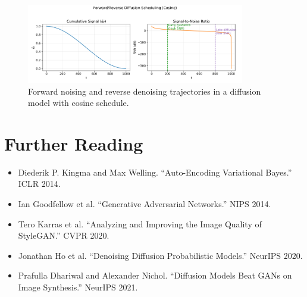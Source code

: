 \documentclass{article}
\begin{document}
\begin{figure}[H]
  \centering
  \includegraphics[width=0.85\textwidth]{diffusion_process.png}
  \caption{Forward noising and reverse denoising trajectories in a diffusion model with cosine schedule.}
  \label{fig:diffusion_process}
\end{figure}
\FloatBarrier

\section*{Further Reading}
\begin{itemize}
  \item Diederik P. Kingma and Max Welling. ``Auto-Encoding Variational Bayes.'' ICLR 2014.
  \item Ian Goodfellow et al. ``Generative Adversarial Networks.'' NIPS 2014.
  \item Tero Karras et al. ``Analyzing and Improving the Image Quality of StyleGAN.'' CVPR 2020.
  \item Jonathan Ho et al. ``Denoising Diffusion Probabilistic Models.'' NeurIPS 2020.
  \item Prafulla Dhariwal and Alexander Nichol. ``Diffusion Models Beat GANs on Image Synthesis.'' NeurIPS 2021.
\end{itemize}
\end{document}
